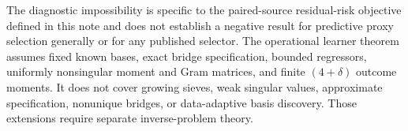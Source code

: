 The diagnostic impossibility is specific to the paired-source residual-risk objective defined in this note and does not establish a negative result for predictive proxy selection generally or for any published selector.  The operational learner theorem assumes fixed known bases, exact bridge specification, bounded regressors, uniformly nonsingular moment and Gram matrices, and finite \((4+\delta)\) outcome moments.  It does not cover growing sieves, weak singular values, approximate specification, nonunique bridges, or data-adaptive basis discovery.  Those extensions require separate inverse-problem theory.